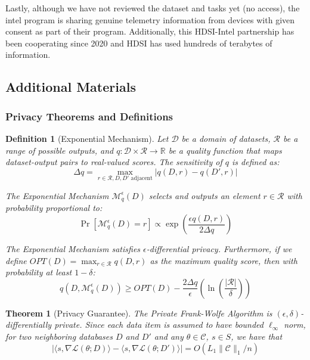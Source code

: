 \documentclass[12pt,letterpaper]{article}
\newtheorem{theorem}{Theorem}[section]
\newtheorem{definition}{Definition}
\begin{document}
Lastly, although we have not reviewed the dataset and tasks yet (no access), the intel program is sharing genuine telemetry information from devices with given consent as part of their program. Additionally, this HDSI-Intel partnership has been cooperating since 2020 and HDSI has used hundreds of terabytes of information.

\subsection{Additional Materials}

\subsubsection{Privacy Theorems and Definitions}

\begin{definition}[Exponential Mechanism]
    \label{def:ExpMech}
    Let $\mathcal{D}$ be a domain of datasets, $\mathcal{R}$ be a range of possible outputs, and $q: \mathcal{D} \times \mathcal{R} \rightarrow \mathbb{R}$ be a quality function that maps dataset-output pairs to real-valued scores. The sensitivity of $q$ is defined as:
    \[
    \Delta q = \max_{r \in \mathcal{R}, D, D' \text{ adjacent}} |q(D,r) - q(D',r)|
    \]
    
    The Exponential Mechanism $\mathcal{M}_q^{\epsilon}(D)$ selects and outputs an element $r \in \mathcal{R}$ with probability proportional to:
    \[
    \Pr[\mathcal{M}_q^{\epsilon}(D) = r] \propto \exp\left(\frac{\epsilon q(D,r)}{2\Delta q}\right)
    \]
    
    The Exponential Mechanism satisfies $\epsilon$-differential privacy. Furthermore, if we define $OPT(D) = \max_{r \in \mathcal{R}} q(D,r)$ as the maximum quality score, then with probability at least $1-\delta$:
    \[
    q(D, \mathcal{M}_q^{\epsilon}(D)) \geq OPT(D) - \frac{2\Delta q}{\epsilon}\left(\ln\left(\frac{|\mathcal{R}|}{\delta}\right)\right)
    \]
\end{definition}

\begin{theorem}[Privacy Guarantee]
\label{thm:dp}
    The Private Frank-Wolfe Algorithm is $(\epsilon, \delta)$-differentially private.
    Since each data item is assumed to have bounded $\ell_{\infty}$ norm, for two neighboring databases $D$ and $D'$ and any $\theta \in \mathcal{C}$, $s \in S$, we have that
    \[
    |\langle s, \nabla \mathcal{L}(\theta; D) \rangle - \langle s, \nabla \mathcal{L}(\theta; D') \rangle| = O(L_1 \|\mathcal{C}\|_1/n)
    \]
\end{theorem}
\end{document}
